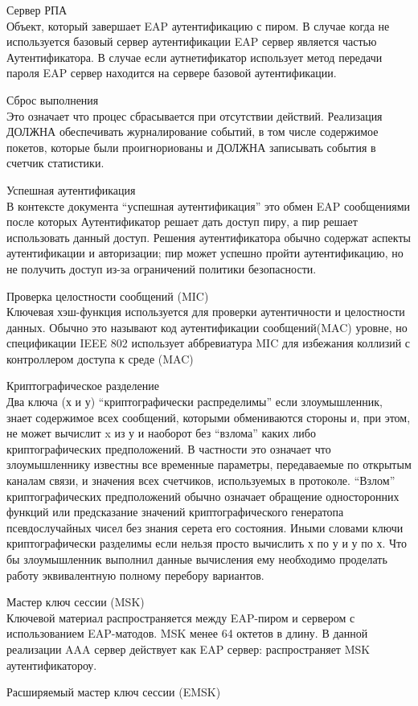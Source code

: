 Сервер РПА \\ Объект, который завершает EAP аутентификацию с пиром. В случае когда не используется базовый сервер аутентификации EAP сервер является частью Аутентификатора. В случае если аутнетификатор использует метод передачи пароля EAP сервер находится на сервере базовой аутентификации.

Сброс выполнения \\ Это означает что процес сбрасывается при отсутствии действий. Реализация ДОЛЖНА обеспечивать журналирование событий, в том числе содержимое покетов, которые были проигнориованы и ДОЛЖНА записывать события в счетчик статистики.

Успешная аутентификация \\ В контексте документа ``успешная аутентификация'' это обмен EAP сообщениями после которых Аутентификатор решает дать доступ пиру, а пир решает использовать данный доступ. Решения аутентификатора обычно содержат аспекты аутентификации и авторизации; пир может успешно пройти аутентификацию, но не получить доступ из-за ограничений политики безопасности.

Проверка целостности сообщений (MIC) \\ Ключевая хэш-функция используется для проверки аутентичности и целостности данных. Обычно это называют код аутентификации сообщений(MAC) уровне, но спецификации IEEE 802 использует аббревиатура MIC для избежания коллизий с контроллером доступа к среде (MAC)

Криптографическое разделение \\ Два ключа (х и у) ``криптографически распределимы'' если злоумышленник, знает содержимое всех сообщений, которыми обмениваются стороны и, при этом, не может вычислит x из у и наоборот без ``взлома'' каких либо криптографических предположений. В частности это означает что злоумышленнику известны все временные параметры, передаваемые по открытым каналам связи, и значения всех счетчиков, используемых в протоколе. ``Взлом'' криптографических предположений обычно означает обращение односторонних функций или предсказание значений криптографического генератопа псевдослучайных чисел без знания серета его состояния. Иными словами ключи криптографически разделимы если нельзя просто вычислить х по у и у по х. Что бы злоумышленник выполнил данные вычисления ему необходимо проделать работу эквивалентную полному перебору вариантов.

Мастер ключ сессии (MSK) \\ Ключевой материал распространяется между EAP-пиром и сервером с использованием EAP-матодов. MSK менее 64 октетов в длину. В данной реализации AAA сервер действует как EAP сервер: распространяет MSK аутентификатороу.

Расширяемый мастер ключ сессии (EMSK) \\ 
